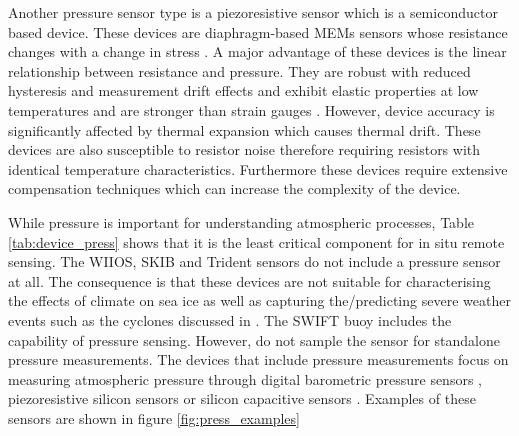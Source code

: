 Another pressure sensor type is a piezoresistive sensor which is a semiconductor based device. These devices are diaphragm-based MEMs sensors whose resistance changes with a change in stress \cite{eaton1997micromachined}. A major advantage of these devices is the linear relationship between resistance and pressure. They are robust with reduced hysteresis and measurement drift effects and exhibit elastic properties at low temperatures and are stronger than strain gauges \cite{eaton1997micromachined}. However, device accuracy is significantly affected by thermal expansion which causes thermal drift. These devices are also susceptible to resistor noise therefore requiring resistors with identical temperature characteristics. Furthermore these devices require extensive compensation techniques which can increase the complexity of the device. \par 


While pressure is important for understanding atmospheric processes, Table \ref{tab:device_press} shows that it is the least critical component for in situ remote sensing. The WIIOS, SKIB and Trident sensors do not include a pressure sensor at all. The consequence is that these devices are not suitable for characterising the effects of climate on sea ice as well as capturing the/predicting severe weather events such as the cyclones discussed in \textcite{vichi2019effects}. The SWIFT buoy includes the capability of pressure sensing. However, do not sample the sensor for standalone pressure measurements. The devices that include pressure measurements focus on measuring atmospheric pressure through digital barometric pressure sensors \cite{rabault2019open,planck2019evolution}, piezoresistive silicon sensors \cite{doble2017robust} or silicon capacitive sensors \cite{uptempo}. Examples of these sensors are shown in figure \ref{fig:press_examples} 

